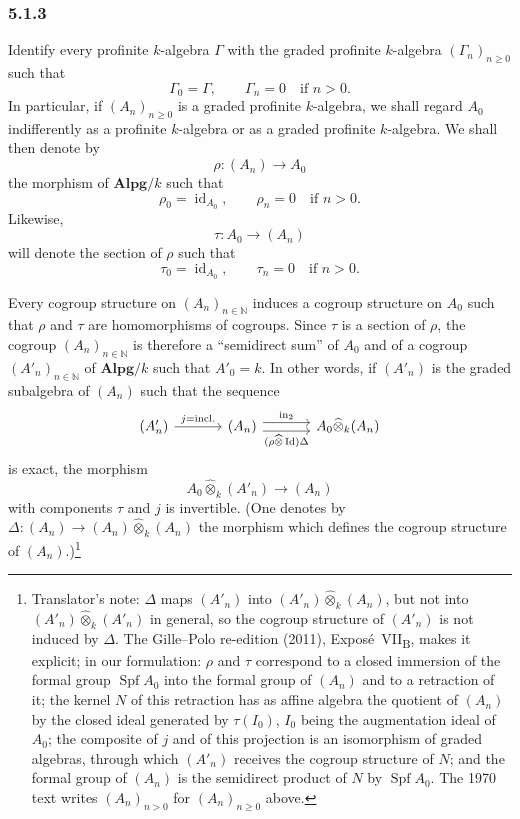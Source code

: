 
\subsubsection*{5.1.3}
\label{sga3:VIIB:5.1.3}

Identify every profinite \(k\)-algebra \(\Gamma\) with the graded
profinite \(k\)-algebra \((\Gamma_n)_{n\geq0}\) such that
\[
  \Gamma_0=\Gamma,
  \qquad
  \Gamma_n=0\quad\text{if }n>0.
\]
In particular, if \((A_n)_{n\geq0}\) is a graded profinite
\(k\)-algebra, we shall regard \(A_0\) indifferently as a profinite
\(k\)-algebra or as a graded profinite \(k\)-algebra. We shall then
denote by
\[
  \rho:(A_n)\longrightarrow A_0
\]
the morphism of \(\mathbf{Alpg}/k\) such that
\[
  \rho_0=\operatorname{id}_{A_0},
  \qquad
  \rho_n=0\quad\text{if }n>0.
\]
Likewise,
\[
  \tau:A_0\longrightarrow(A_n)
\]
will denote the section of \(\rho\) such that
\[
  \tau_0=\operatorname{id}_{A_0},
  \qquad
  \tau_n=0\quad\text{if }n>0.
\]

Every cogroup structure on \((A_n)_{n\in\mathbb N}\) induces a cogroup
structure on \(A_0\) such that \(\rho\) and \(\tau\) are homomorphisms of
cogroups. Since \(\tau\) is a section of \(\rho\), the cogroup
\((A_n)_{n\in\mathbb N}\) is therefore a ``semidirect sum'' of \(A_0\)
and of a cogroup \((A'_n)_{n\in\mathbb N}\) of \(\mathbf{Alpg}/k\) such
that \(A'_0=k\). In other words, if \((A'_n)\) is the graded subalgebra
of \((A_n)\) such that the sequence
\[
  \begin{tikzcd}[column sep=3.4em]
    (A'_n) \arrow[r,"j=\mathrm{incl.}"]
    & (A_n)
      \arrow[r,shift left=0.7ex,"\mathrm{in}_2"]
      \arrow[r,shift right=0.7ex,"(\rho\widehat\otimes\operatorname{Id})\Delta"']
    & A_0\widehat\otimes_k(A_n)
  \end{tikzcd}
\]
is exact, the morphism
\[
  A_0\widehat\otimes_k(A'_n)\longrightarrow(A_n)
\]
with components \(\tau\) and \(j\) is invertible. \textup{(One denotes
by \(\Delta:(A_n)\to(A_n)\widehat\otimes_k(A_n)\) the morphism which
defines the cogroup structure of \((A_n)\).)}\footnote{Translator's note: \(\Delta\) maps
\((A'_n)\) into \((A'_n)\widehat\otimes_k(A_n)\), but not into \((A'_n)\widehat\otimes_k(A'_n)\) in general,
so the cogroup structure of \((A'_n)\) is not induced by \(\Delta\). The Gille--Polo re-edition (2011),
Expos\'e~VII\textsubscript{B}, makes it explicit; in our formulation: \(\rho\) and \(\tau\) correspond to a
closed immersion of the formal group \(\operatorname{Spf}A_0\) into the formal group of \((A_n)\) and to a
retraction of it; the kernel \(N\) of this retraction has as affine algebra the quotient of \((A_n)\) by the
closed ideal generated by \(\tau(I_0)\), \(I_0\) being the augmentation ideal of \(A_0\); the composite of
\(j\) and of this projection is an isomorphism of graded algebras, through which \((A'_n)\) receives the
cogroup structure of \(N\); and the formal group of \((A_n)\) is the semidirect product of \(N\) by
\(\operatorname{Spf}A_0\). The 1970 text writes \((A_n)_{n>0}\) for \((A_n)_{n\geq0}\) above.}
